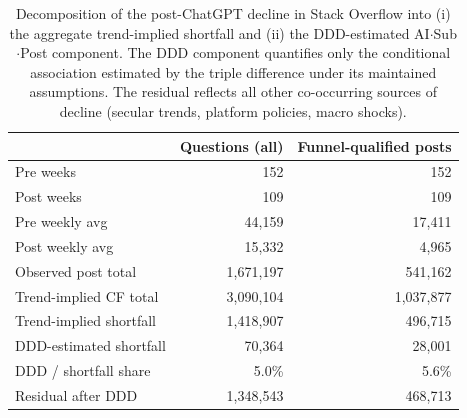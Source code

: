 \begin{table}[ht]
\centering
\caption{Decomposition of the post-ChatGPT decline in Stack Overflow into (i) the aggregate trend-implied shortfall and (ii) the DDD-estimated AI$\cdot$Sub$\cdot$Post component. The DDD component quantifies only the conditional association estimated by the triple difference under its maintained assumptions. The residual reflects all other co-occurring sources of decline (secular trends, platform policies, macro shocks).}
\label{tab:decline_decomposition}
\begin{tabular}{lrr}
\toprule
 & Questions (all) & Funnel-qualified posts \\
\midrule
Pre weeks & 152 & 152 \\
Post weeks & 109 & 109 \\
Pre weekly avg & 44,159 & 17,411 \\
Post weekly avg & 15,332 & 4,965 \\
\midrule
Observed post total & 1,671,197 & 541,162 \\
Trend-implied CF total & 3,090,104 & 1,037,877 \\
Trend-implied shortfall & 1,418,907 & 496,715 \\
\midrule
DDD-estimated shortfall & 70,364 & 28,001 \\
DDD / shortfall share & 5.0\% & 5.6\% \\
Residual after DDD & 1,348,543 & 468,713 \\
\bottomrule
\end{tabular}
\end{table}
